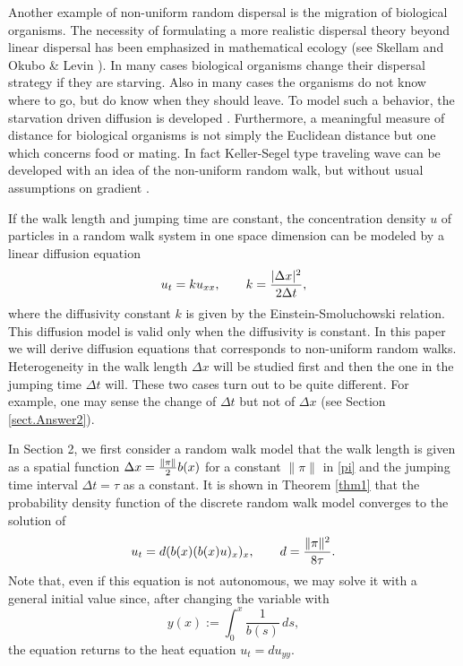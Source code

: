 \documentclass[11pt]{amsart}
\begin{document}
Another example of non-uniform random dispersal is the migration of biological organisms. The necessity of formulating a more realistic dispersal theory beyond linear dispersal has been emphasized in mathematical ecology (see Skellam \cite{Skellam72,Skellam73} and Okubo \& Levin \cite[Chapter 5]{MR1895041}). In many cases biological organisms change their dispersal strategy if they are starving. Also in many cases the organisms do not know where to go, but do know when they should leave. To model such a behavior, the starvation driven diffusion is developed \cite{MR3050058,MR3128024,MR3189110}. Furthermore, a meaningful measure of distance for biological organisms is not simply the Euclidean distance but one which concerns food or mating. In fact Keller-Segel type traveling wave can be developed with an idea of the non-uniform random walk, but without usual assumptions on gradient \cite{ChoiKim,YoonKim}.

If the walk length and jumping time are constant, the concentration density $u$ of particles in a random walk system in one space dimension can be modeled by a linear diffusion equation
\begin{equation}\label{LinearDiffusion}
u_t=ku_{xx},\qquad k={|\Delta x|^2\over 2\Delta t},
\end{equation}
where the diffusivity constant $k$ is given by the Einstein-Smoluchowski relation. This diffusion model is valid only when the diffusivity is constant. In this paper we will derive diffusion equations that corresponds to non-uniform random walks. Heterogeneity in the walk length $\Delta x$ will be studied first and then the one in the jumping time $\Delta t$ will. These two cases turn out to be quite different. For example, one may sense the change of $\Delta t$ but not of $\Delta x$ (see Section \ref{sect.Answer2}).

In Section 2, we first consider a random walk model that the walk length is given as a spatial function $\Delta x={\|\pi\|\over2}b(x)$ for a constant $\|\pi\|$ in \eqref{pi} and the jumping time interval $\Delta t=\tau$ as a constant. It is shown in Theorem \ref{thm1} that the probability density function of the discrete random walk model converges to the solution of
$$
u_t=d(b(x)(b(x)u)_x)_x,\qquad d={\|\pi\|^2\over 8\tau}.
$$
Note that, even if this equation is not autonomous, we may solve it with a general initial value since, after changing the variable with
$$
y(x):=\int_0^x \frac{1}{b(s)}\,ds,
$$
the equation returns to the heat equation $u_t=du_{yy}$.
\end{document}
